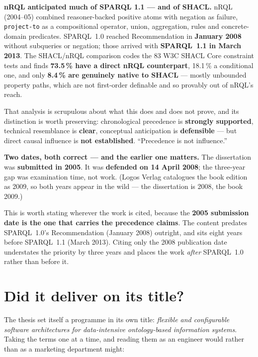 \documentclass[11pt,a4paper,DIV=12,parskip=half]{scrartcl}
\newenvironment{note}
  {\begin{list}{}{\setlength{\leftmargin}{1.5em}\setlength{\rightmargin}{1.5em}%
                  \setlength{\listparindent}{0pt}}\item[]\small}
  {\end{list}}
\begin{document}
\begin{note}
\textbf{nRQL anticipated much of SPARQL 1.1 --- and of SHACL.} nRQL (2004--05)
combined reasoner-backed positive atoms with negation as failure,
\texttt{project-to} as a compositional operator, union, aggregation, rules and
concrete-domain predicates. SPARQL~1.0 reached Recommendation in \textbf{January
2008} without subqueries or negation; those arrived with \textbf{SPARQL~1.1 in
March 2013}. The SHACL/nRQL comparison codes the 83 W3C SHACL Core constraint
tests and finds \textbf{73.5\,\% have a direct nRQL counterpart}, 18.1\,\% a
conditional one, and only \textbf{8.4\,\% are genuinely native to SHACL} ---
mostly unbounded property paths, which are not first-order definable and so
provably out of nRQL's reach.

That analysis is scrupulous about what this does and does not prove, and its
distinction is worth preserving: chronological precedence is \textbf{strongly
supported}, technical resemblance is \textbf{clear}, conceptual anticipation is
\textbf{defensible} --- but direct causal influence is \textbf{not established}.
\enquote{Precedence is not influence.}
\end{note}

\begin{note}
\textbf{Two dates, both correct --- and the earlier one matters.} The
dissertation was \textbf{submitted in 2005}. It was \textbf{defended on 14 April
2008}; the three-year gap was examination time, not work. (Logos Verlag
catalogues the book edition as 2009, so both years appear in the wild --- the
dissertation is 2008, the book 2009.)

This is worth stating wherever the work is cited, because the \textbf{2005
submission date is the one that carries the precedence claims}. The content
predates SPARQL~1.0's Recommendation (January 2008) outright, and sits eight
years before SPARQL~1.1 (March 2013). Citing only the 2008 publication date
understates the priority by three years and places the work \emph{after}
SPARQL~1.0 rather than before it.
\end{note}

\section{Did it deliver on its title?}

The thesis set itself a programme in its own title: \emph{flexible and
configurable software architectures for data-intensive ontology-based information
systems}. Taking the terms one at a time, and reading them as an engineer would
rather than as a marketing department might:
\end{document}
